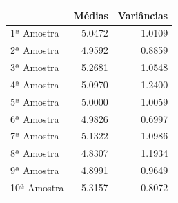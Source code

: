 \begin{tabular}{lrr}
\toprule
 & Médias & Variâncias \\
\midrule
1ª Amostra & 5.0472 & 1.0109 \\
2ª Amostra & 4.9592 & 0.8859 \\
3ª Amostra & 5.2681 & 1.0548 \\
4ª Amostra & 5.0970 & 1.2400 \\
5ª Amostra & 5.0000 & 1.0059 \\
6ª Amostra & 4.9826 & 0.6997 \\
7ª Amostra & 5.1322 & 1.0986 \\
8ª Amostra & 4.8307 & 1.1934 \\
9ª Amostra & 4.8991 & 0.9649 \\
10ª Amostra & 5.3157 & 0.8072 \\
\bottomrule
\end{tabular}

